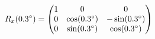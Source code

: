 \documentclass[preview]{standalone}
\begin{document}
\begin{align*}
\special{dvisvgm:raw <g id='unique000'>}R_x(0.3^\circ) = \begin{pmatrix} 1 & 0 & 0 \\ 0 & \cos(0.3^\circ) & -\sin(0.3^\circ) \\ 0 & \sin(0.3^\circ) & \cos(0.3^\circ) \end{pmatrix}\special{dvisvgm:raw </g>}
\end{align*}
\end{document}
